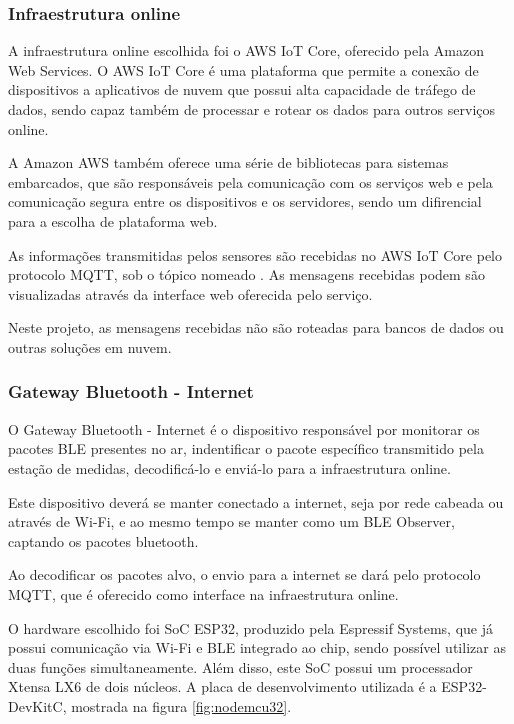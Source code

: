
\subsubsection{Infraestrutura online}

A infraestrutura online escolhida foi o AWS IoT Core, oferecido pela Amazon Web
Services. O AWS IoT Core é uma plataforma que permite a conexão de dispositivos
a aplicativos de nuvem que possui alta capacidade de tráfego de dados, sendo
capaz também de processar e rotear os dados para outros serviços online.
\cite{AWS_IoTCore}

A Amazon AWS também oferece uma série de bibliotecas para sistemas embarcados,
que são responsáveis pela comunicação com os serviços web e pela comunicação
segura entre os dispositivos e os servidores, sendo um difirencial para a
escolha de plataforma web.

As informações transmitidas pelos sensores são recebidas no AWS IoT Core pelo
protocolo MQTT, sob o tópico nomeado . As mensagens
recebidas podem são visualizadas através da interface web oferecida pelo
serviço.

Neste projeto, as mensagens recebidas não são roteadas para bancos de dados ou
outras soluções em nuvem.


\subsubsection{Gateway Bluetooth - Internet}


O Gateway Bluetooth - Internet é o dispositivo responsável por monitorar os
pacotes BLE presentes no ar, indentificar o pacote específico transmitido pela
estação de medidas, decodificá-lo e enviá-lo para a infraestrutura online.

Este dispositivo deverá se manter conectado a internet, seja por rede cabeada
ou através de Wi-Fi, e ao mesmo tempo se manter como um BLE Observer, captando os
pacotes bluetooth.

Ao decodificar os pacotes alvo, o envio para a internet se dará pelo protocolo MQTT,
que é oferecido como interface na infraestrutura online.


O hardware escolhido foi SoC ESP32, produzido pela Espressif Systems, que já possui
comunicação via Wi-Fi e BLE integrado ao chip, sendo possível utilizar as duas funções
simultaneamente. Além disso, este SoC possui um processador Xtensa LX6 de dois
núcleos. A placa de desenvolvimento utilizada é a ESP32-DevKitC, mostrada na
figura \ref{fig:nodemcu32}.\cite{ESP32Datasheet}

